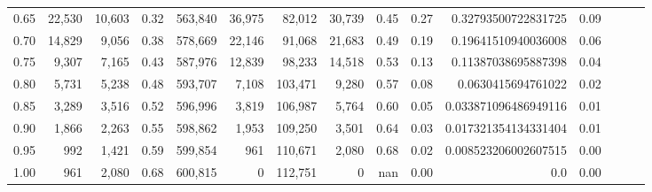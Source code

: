 \begin{tabular}{rrrrrrrrrrrrrrr}
0.65 &  22,530 &  10,603 &  0.32 &  563,840 &   36,975 &   82,012 &   30,739 &  0.45 &  0.27 &   0.32793500722831725 &      0.09 \\
0.70 &  14,829 &   9,056 &  0.38 &  578,669 &   22,146 &   91,068 &   21,683 &  0.49 &  0.19 &   0.19641510940036008 &      0.06 \\
0.75 &   9,307 &   7,165 &  0.43 &  587,976 &   12,839 &   98,233 &   14,518 &  0.53 &  0.13 &   0.11387038695887398 &      0.04 \\
0.80 &   5,731 &   5,238 &  0.48 &  593,707 &    7,108 &  103,471 &    9,280 &  0.57 &  0.08 &    0.0630415694761022 &      0.02 \\
0.85 &   3,289 &   3,516 &  0.52 &  596,996 &    3,819 &  106,987 &    5,764 &  0.60 &  0.05 &  0.033871096486949116 &      0.01 \\
0.90 &   1,866 &   2,263 &  0.55 &  598,862 &    1,953 &  109,250 &    3,501 &  0.64 &  0.03 &  0.017321354134331404 &      0.01 \\
0.95 &     992 &   1,421 &  0.59 &  599,854 &      961 &  110,671 &    2,080 &  0.68 &  0.02 &  0.008523206002607515 &      0.00 \\
1.00 &     961 &   2,080 &  0.68 &  600,815 &        0 &  112,751 &        0 &   nan &  0.00 &                   0.0 &      0.00 \\
\bottomrule
\end{tabular}
